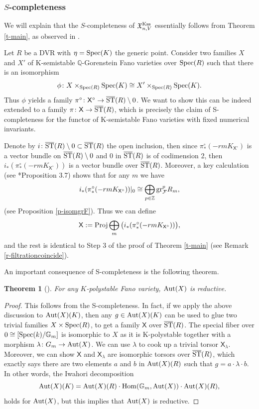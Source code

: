 \documentclass[12pt,reqno]{amsart}%
\newcommand{\cF}{\mathcal{F}}
\newtheorem{thm}{Theorem}[section]
\theoremstyle{definition}
\theoremstyle{remark}
\begin{document}
\subsubsection{$S$-completeness}\label{sss-Scompleteness}

  We will explain that the $S$-completeness of $\mathfrak X^{\rm Kss}_{n,V} $ essentially follows from Theorem \ref{t-main}, as observed in \cite{ABHX19}.

Let $R$ be a DVR with $\eta={\rm Spec}(K)$ the generic point. Consider two families $X$ and $X'$ of K-semistable $\mathbb{Q}$-Gorenstein Fano varieties over ${\rm Spec}(R)$ such that there is an isomorphism 
\[
\phi\colon X\times_{{\rm Spec}(R)} {\rm Spec}(K) \cong X'\times_{{\rm Spec}(R)  }{\rm Spec}(K).
\]
Thus $\phi$ yields a family $\pi^{\circ}\colon \mathsf{X}^{\circ}\to \overline{\rm ST}(R)\setminus 0$. We want to show this can be indeed extended to a family 
$\pi\colon\mathsf{X}\to \overline{\rm ST}(R)$, which is precisely the claim of S-completeness for the functor of K-semistable Fano varieties with fixed numerical invariants.

Denote by $i\colon \overline{\rm ST}(R)\setminus 0\subset \overline{\rm ST}(R)$ the open inclusion, then since $\pi^{\circ}_*(-rmK_{ \mathsf{X}^{\circ}})$ is a vector bundle on $\overline{\rm ST}(R)\setminus 0$ and $0$ in $\overline{\rm ST}(R)$ is of codimension 2, then
$i_*(\pi^{\circ}_*(-rmK_{ \mathsf{X}^{\circ}}))$ is a vector bundle over $\overline{\rm ST}(R)$. Moreover, a key calculation (see \cite{ABHX19}*{Proposition 3.7}) shows that for any $m$ we have
$$i_*(\pi^{\circ}_*(-rmK_{ \mathsf{X}^{\circ}}))|_{0}\cong  \bigoplus_{p\in \mathbb{Z} }{\rm gr}_\cF^p R_m,$$
(see Proposition \ref{p-isomgrF}). Thus we can define 
$$ \mathsf{X}:={\rm Proj}\bigoplus_m\big(i_*(\pi^{\circ}_*(-rmK_{ \mathsf{X}^{\circ}}))\big),$$
and the rest is identical to Step 3 of the proof of Theorem \ref{t-main} (see Remark \ref{r-filtrationcoincide}). 

An important consequence of S-completeness is the following theorem.
\begin{thm}[{\cite{ABHX19}}]\label{t-reductive}
For any $K$-polystable Fano variety, ${\rm Aut}(X)$ is reductive.
\end{thm}
\begin{proof}This follows from the S-completeness. In fact, if we apply the above discussion to ${\rm Aut}(X)(K)$, then any $g\in {\rm Aut}(X)(K)$ can be used to glue two trivial families $X\times {\rm Spec}(R)$, to get a family $ \mathsf{X} $ over $\overline{\rm ST}(R)$. The special fiber over $0\cong [{\rm Spec}(k)/\mathbb{G}_m]$  is isomorphic to $X$ as it is K-polystable together with a morphism $\lambda\colon G_m\to {\rm Aut}(X)$. We can use $\lambda$ to cook up a trivial torsor $\mathsf{X} _{\lambda}$.
Moreover, we can show   $\mathsf{X} $ and  $\mathsf{X} _{\lambda}$ are isomorphic torsors over $\overline{\rm ST}(R)$, which exactly says there are two elements $a$ and $b$ in ${\rm Aut}(X)(R)$ such that $g=a\cdot \lambda \cdot b$. In other words,  the Iwahori decomposition 
$${\rm Aut}(X)(K)={\rm Aut}(X)(R)\cdot {\rm Hom}(\mathbb{G}_m, {\rm Aut}(X)) \cdot {\rm Aut}(X)(R),$$
holds for ${\rm Aut}(X)$, but this implies that ${\rm Aut}(X)$ is reductive.  
\end{proof}
\end{document}

